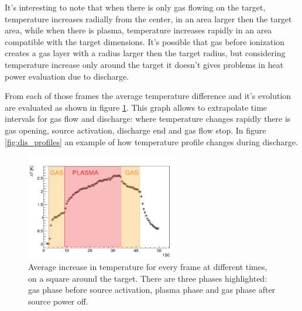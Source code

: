 It's interesting to note that when there is only gas flowing on the target, temperature increases radially from the center, in an area larger then the target area, while when there is plasma, temperature increases rapidly in an area compatible with the target dimensions. It's possible that gas before ionization creates a gas layer with a radius larger then the target radius, but considering temperature increase only around the target it doesn't gives problems in heat power evaluation due to discharge.

From each of those frames the average temperature difference and it's evolution are evaluated as shown in figure \ref{fig:Tavg}. This graph allows to extrapolate time intervals for gas flow and discharge: where temperature changes rapidly there is gas opening, source activation, discharge end and gas flow stop. In figure \ref{fig:dis_profiles} an example of how temperature profile changes during discharge.
\begin{figure}
 \centering
 \includegraphics[width=0.6\textwidth]{Images/Temperature/f5t4d4_Tavg_lines.png}
 \caption{Average increase in temperature for every frame at different times, on a square around the target. There are three phases highlighted: gas phase before source activation, plasma phase and gas phase after source power off.}
 \label{fig:Tavg}
\end{figure}

